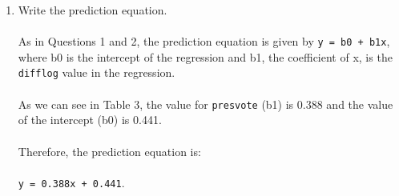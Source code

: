 \documentclass[12pt,letterpaper]{article}
\begin{document}
\begin{enumerate}
		\item Write the prediction equation.
\\\\
\noindent As in Questions 1 and 2, the prediction equation is given by \texttt{y = b0 + b1x}, where b0 is the intercept of the regression and b1, the coefficient of x, is the \texttt{difflog} value in the regression.
\\\\
\noindent As we can see in Table 3, the value for \texttt{presvote} (b1) is 0.388 and the value of the intercept (b0) is 0.441.
\\\\
\noindent Therefore, the prediction equation is:
\\\\
\noindent \texttt{y = 0.388x + 0.441}.
		
	\end{enumerate}
	

\newpage	
\end{document}
